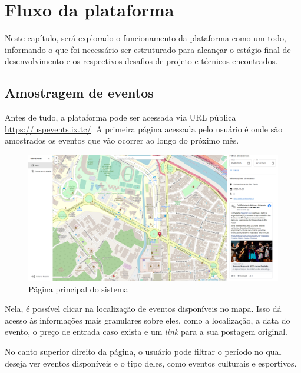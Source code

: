 
\chapter{Fluxo da plataforma}

Neste capítulo, será explorado o funcionamento da plataforma como um todo,
informando o que foi necessário ser estruturado para alcançar o estágio final
de desenvolvimento e os respectivos desafios de projeto e técnicos encontrados.

\section{Amostragem de eventos}
\label{sec:EventsSampling}

Antes de tudo, a plataforma pode ser acessada via \acs{URL}\label{acro:URL}
pública \url{https://uspevents.ix.tc/}. A primeira página acessada pelo usuário
é onde são amostrados os eventos que vão ocorrer ao longo do próximo mês.

\begin{figure}[h]
    \centering
    \includegraphics[width=1\textwidth]{figuras/pagina_inicial.png}
    \caption{Página principal do sistema}
    \label{fig:enter-label}
\end{figure}

Nela, é possível clicar na localização de eventos disponíveis no mapa. Isso dá
acesso às informações mais granulares sobre eles, como a localização, a data do
evento, o preço de entrada caso exista e um \textit{link} para a sua postagem
original.

No canto superior direito da página, o usuário pode filtrar o período no qual
deseja ver eventos disponíveis e o tipo deles, como eventos culturais e
esportivos.

